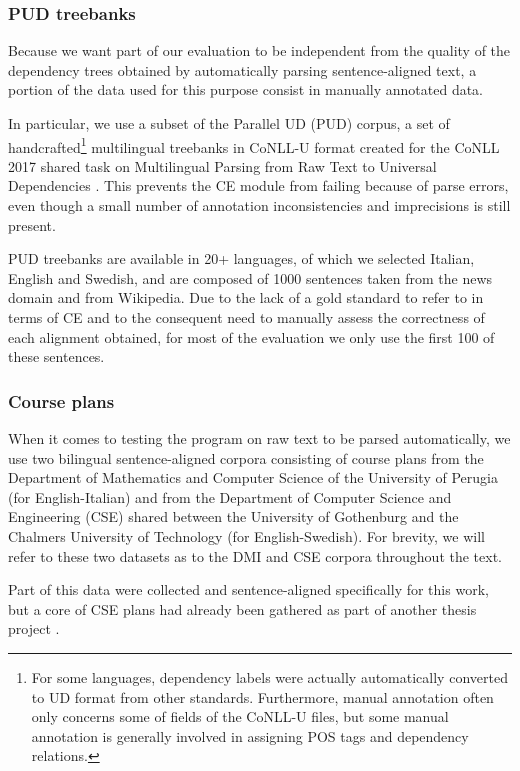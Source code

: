 \subsubsection{PUD treebanks}
Because we want part of our evaluation to be independent from the quality of the dependency trees obtained by automatically parsing sentence-aligned text, a portion of the data used for this purpose consist in manually annotated data. \smallskip

In particular, we use a subset of the Parallel UD (PUD) corpus, a set of handcrafted\footnote{For some languages, dependency labels were actually automatically converted to UD format from other standards. Furthermore, manual annotation often only concerns some of fields of the CoNLL-U files, but some manual annotation is generally involved in assigning POS tags and dependency relations.} multilingual treebanks in CoNLL-U format created for the CoNLL 2017 shared task on Multilingual Parsing from Raw Text to Universal Dependencies \cite{mprtud}. This prevents the CE module from failing because of parse errors, even though a small number of annotation inconsistencies and imprecisions is still present. \smallskip

PUD treebanks are available in 20+ languages, of which we selected Italian, English and Swedish, and are composed of 1000 sentences taken from the news domain and from Wikipedia. Due to the lack of a gold standard to refer to in terms of CE and to the consequent need to manually assess the correctness of each alignment obtained, for most of the evaluation we only use the first 100 of these sentences. \smallskip

\subsubsection{Course plans} \label{plans}
When it comes to testing the program on raw text to be parsed automatically, we use two bilingual sentence-aligned corpora consisting of course plans from the Department of Mathematics and Computer Science of the University of Perugia (for English-Italian) and from the Department of Computer Science and Engineering (CSE) shared between the University of Gothenburg and the Chalmers University of Technology (for English-Swedish). For brevity, we will refer to these two datasets as to the DMI and CSE corpora throughout the text.\smallskip

Part of this data were collected and sentence-aligned specifically for this work, but a core of CSE plans had already been gathered as part of another thesis project \cite{thesis}. \smallskip

